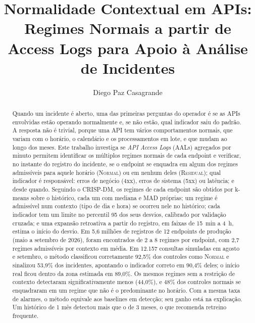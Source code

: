 \documentclass[sigconf,nonacm]{acmart}
\newcommand{\Normal}{\textsc{Normal}\xspace}
\newcommand{\Residual}{\textsc{Residual}\xspace}
\begin{document}
\title{Normalidade Contextual em APIs: Regimes Normais a partir de Access Logs para Apoio à Análise de Incidentes}

\author{Diego Paz Casagrande}

\renewcommand{\shortauthors}{D. P. Casagrande}

\begin{abstract}
Quando um incidente é aberto, uma das primeiras perguntas do operador é se as APIs envolvidas estão operando normalmente e, se não estão, qual indicador saiu do padrão. A resposta não é trivial, porque uma API tem vários comportamentos normais, que variam com o horário, o calendário e os processamentos em lote, e que mudam ao longo dos meses. Este trabalho investiga se \emph{API Access Logs} (AALs) agregados por minuto permitem identificar os múltiplos regimes normais de cada endpoint e verificar, no instante do registro do incidente, se o endpoint se enquadra em algum dos regimes admissíveis para aquele horário (\Normal) ou em nenhum deles (\Residual); qual indicador é responsável: erros de negócio (4xx), erros de sistema (5xx) ou latência; e desde quando. Seguindo o CRISP-DM, os regimes de cada endpoint são obtidos por k-means sobre o histórico, cada um com mediana e MAD próprias; um regime é admissível num contexto (tipo de dia e hora) se ocorreu nele no histórico; cada indicador tem um limite no percentil 95 dos seus desvios, calibrado por validação cruzada; e uma expansão retroativa a partir do registro, em faixas de 15~min a 4~h, estima o início do desvio. Em 5,6 milhões de registros de 12 endpoints de produção (maio a setembro de 2026), foram encontrados de 2 a 8 regimes por endpoint, com 2,7 regimes admissíveis por contexto em média. Em 12.157 consultas simuladas em agosto e setembro, o método classificou corretamente 92,5\% dos controles como \Normal e sinalizou 53,9\% dos incidentes, apontando o indicador correto em 90,4\% deles; o início real ficou dentro da zona estimada em 89,0\%. Os mesmos regimes sem a restrição de contexto detectaram significativamente menos (44,0\%), e 48\% dos controles normais se enquadraram em um regime que não é o predominante no horário. Com a mesma taxa de alarmes, o método equivale aos baselines em detecção; seu ganho está na explicação. Um histórico de 1 mês detectou mais que o de 3 meses, o que recomenda retreino frequente.
\end{abstract}

\end{document}
